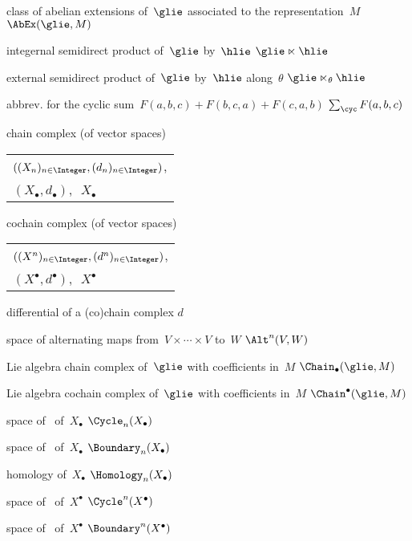 {class of abelian extensions of~$\glie$ associated to the representation~$M$}
{$\AbEx(\glie, M)$}

{integernal semidirect product of~$\glie$ by~$\hlie$}
{$\glie \ltimes \hlie$}

{external semidirect product of~$\glie$ by~$\hlie$ along~$\theta$}
{$\glie \ltimes_\theta \hlie$}

{abbrev. for the cyclic sum~$F(a,b,c) + F(b,c,a) + F(c,a,b)$}
{$\sum_{\cyc} F(a,b,c)$}

{chain complex (of vector spaces)}
{
	\begin{tabular}[t]{@{}l@{}}
		$((X_n)_{n \in \Integer}, (d_n)_{n \in \Integer})$, \\
		$(X_\bullet, d_\bullet)$,\,~$X_\bullet$
	\end{tabular}
}
{cochain complex (of vector spaces)}
{
	\begin{tabular}[t]{@{}l@{}}
		$((X^n)_{n \in \Integer}, (d^n)_{n \in \Integer})$, \\
		$(X^\bullet, d^\bullet)$,\,~$X^\bullet$
	\end{tabular}
}

{differential of a (co)chain complex}
{$d$}

{space of alternating maps from~$V \times \dotsb \times V$ to~$W$}
{$\Alt^n(V,W)$}

{Lie algebra chain complex of~$\glie$ with coefficients in~$M$}
{$\Chain_\bullet(\glie, M)$}

{Lie algebra cochain complex of~$\glie$ with coefficients in~$M$}
{$\Chain^\bullet(\glie, M)$}

{space of~ of~$X_\bullet$}
{$\Cycle_n(X_\bullet)$}

{space of~ of~$X_\bullet$}
{$\Boundary_n(X_\bullet)$}

{ homology of~$X_\bullet$}
{$\Homology_n(X_\bullet)$}

{space of~ of~$X^\bullet$}
{$\Cycle^n(X^\bullet)$}

{space of~ of~$X^\bullet$}
{$\Boundary^n(X^\bullet)$}

